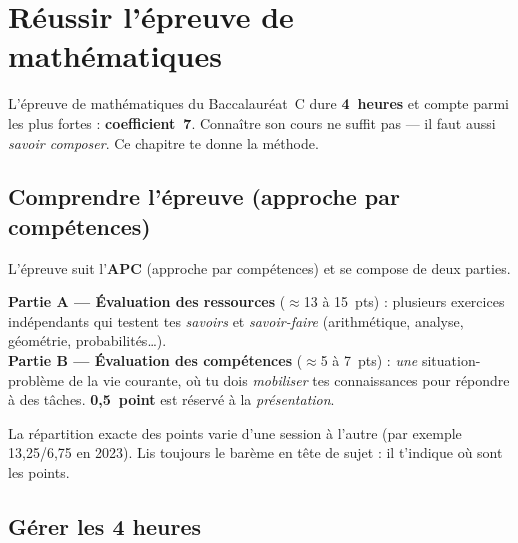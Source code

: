 \chapter{Réussir l'épreuve de mathématiques}

\noindent L'épreuve de mathématiques du Baccalauréat~C dure \textbf{4~heures} et compte
parmi les plus fortes : \textbf{coefficient~7}. Connaître son cours ne suffit pas — il
faut aussi \emph{savoir composer}. Ce chapitre te donne la méthode.

\section{Comprendre l'épreuve (approche par compétences)}

L'épreuve suit l'\textbf{APC} (approche par compétences) et se compose de deux parties.

\begin{aretenir}
\textbf{Partie A — Évaluation des ressources} ($\approx$13 à 15~pts) : plusieurs
exercices indépendants qui testent tes \emph{savoirs} et \emph{savoir-faire}
(arithmétique, analyse, géométrie, probabilités…).\\[4pt]
\textbf{Partie B — Évaluation des compétences} ($\approx$5 à 7~pts) : \emph{une}
situation-problème de la vie courante, où tu dois \emph{mobiliser} tes connaissances
pour répondre à des tâches. \textbf{0,5~point} est réservé à la \emph{présentation}.
\end{aretenir}

\begin{remarque}
La répartition exacte des points varie d'une session à l'autre (par exemple 13,25/6,75
en 2023). Lis toujours le barème en tête de sujet : il t'indique où sont les points.
\end{remarque}

\section{Gérer les 4 heures}

